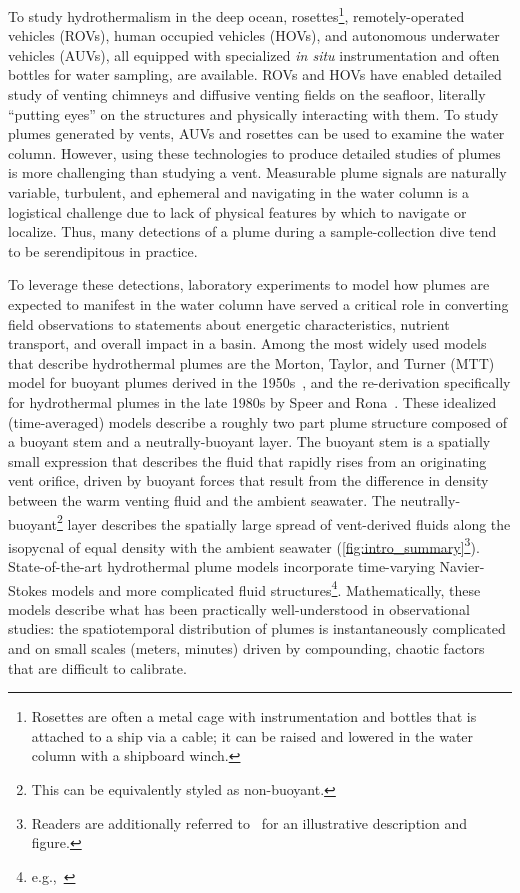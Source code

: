 To study hydrothermalism in the deep ocean, rosettes\footnote{Rosettes are often a metal cage with instrumentation and bottles that is attached to a ship via a cable; it can be raised and lowered in the water column with a shipboard winch.}, remotely-operated vehicles (ROVs), human occupied vehicles (HOVs), and autonomous underwater vehicles (AUVs), all equipped with specialized \emph{in situ} instrumentation and often bottles for water sampling, are available.
ROVs and HOVs have enabled detailed study of venting chimneys and diffusive venting fields on the seafloor, literally ``putting eyes'' on the structures and physically interacting with them.
To study plumes generated by vents, AUVs and rosettes can be used to examine the water column.
However, using these technologies to produce detailed studies of plumes is more challenging than studying a vent.
Measurable plume signals are naturally variable, turbulent, and ephemeral and navigating in the water column is a logistical challenge due to lack of physical features by which to navigate or localize. 
Thus, many detections of a plume during a sample-collection dive tend to be serendipitous in practice.

To leverage these detections, laboratory experiments to model how plumes are expected to manifest in the water column have served a critical role in converting field observations to statements about energetic characteristics, nutrient transport, and overall impact in a basin.
Among the most widely used models that describe hydrothermal plumes are the Morton, Taylor, and Turner (MTT) model for buoyant plumes derived in the 1950s~\autocite{morton1956turbulent}, and the re-derivation specifically for hydrothermal plumes in the late 1980s by Speer and Rona~\autocite{speer1989model}.
These idealized (time-averaged) models describe a roughly two part plume structure composed of a buoyant stem and a neutrally-buoyant layer. 
The buoyant stem is a spatially small expression that describes the fluid that rapidly rises from an originating vent orifice, driven by buoyant forces that result from the difference in density between the warm venting fluid and the ambient seawater.
The neutrally-buoyant\footnote{This can be equivalently styled as non-buoyant.} layer describes the spatially large spread of vent-derived fluids along the isopycnal of equal density with the ambient seawater (\cref{fig:intro_summary}\footnote{Readers are additionally referred to~\autocite{yoerger2007autonomous} for an illustrative description and figure.}). 
State-of-the-art hydrothermal plume models incorporate time-varying Navier-Stokes models and more complicated fluid structures\footnote{e.g.,~\autocite{lavelle2013turbulent,xu2012deep}}.
Mathematically, these models describe what has been practically well-understood in observational studies: the spatiotemporal distribution of plumes is instantaneously complicated and on small scales (meters, minutes) driven by compounding, chaotic factors that are difficult to calibrate.



